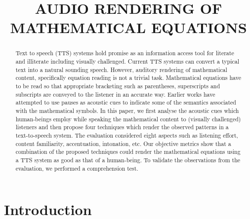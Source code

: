 \documentclass{article}
\title{AUDIO RENDERING OF MATHEMATICAL EQUATIONS}
\begin{document}
\maketitle

\begin{abstract}

Text to speech (TTS) systems hold promise as an information access tool for literate and illiterate including visually challenged. Current TTS systems can convert a typical text into a  natural sounding speech. However, auditory rendering of mathematical content, specifically equation reading is not a trivial task. Mathematical equations have to be read so that appropriate bracketing such as parentheses, superscripts and subscripts are conveyed to the listener in an accurate way. Earlier works have attempted to use pauses as acoustic cues to indicate some of the semantics associated with the mathematical symbols.
In this paper, we first analyse the acoustic cues which human-beings employ while speaking the mathematical content to (visually challenged) listeners and then propose four techniques which render the observed patterns in a text-to-speech system. The evaluation considered eight aspects such as listening effort, content familiarity, accentuation, intonation, etc. Our objective metrics show that a combination of the proposed techniques could render the mathematical equations using a TTS system as good as that of a human-being. To validate the observations from the evaluation, we performed a comprehension test.

\end{abstract}

\section{Introduction}
\label{sec:intro}
\end{document}
